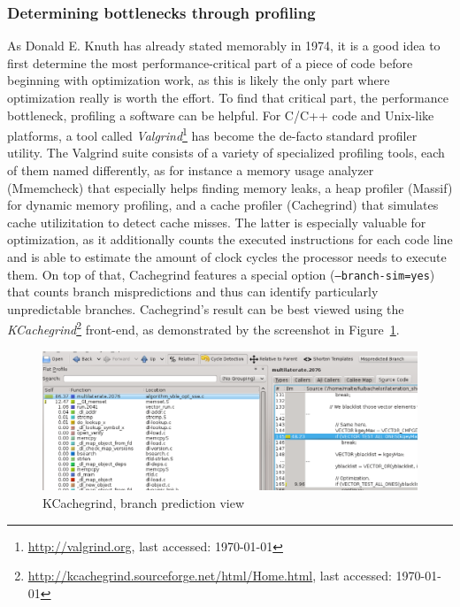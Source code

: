 \subsubsection{Determining bottlenecks through profiling}
As Donald E. Knuth has already stated memorably in 1974, it is a good idea to first determine the most performance-critical part of a piece of code before beginning with optimization work, as this is likely the only part where optimization really is worth the effort. To find that critical part, the performance bottleneck, profiling a software can be helpful. For C/C++ code and Unix-like platforms, a tool called \emph{Valgrind}\footnote{\url{http://valgrind.org}, last accessed: \today{}} has become the de-facto standard profiler utility. The Valgrind suite consists of a variety of specialized profiling tools, each of them named differently, as for instance a memory usage analyzer (Mmemcheck) that especially helps finding memory leaks, a heap profiler (Massif) for dynamic memory profiling, and a cache profiler (Cachegrind) that simulates cache utilizitation to detect cache misses. The latter is especially valuable for optimization, as it additionally counts the executed instructions for each code line and is able to estimate the amount of clock cycles the processor needs to execute them. On top of that, Cachegrind features a special option (\texttt{--branch-sim=yes}) that counts branch mispredictions and thus can identify particularly unpredictable branches. Cachegrind's result can be best viewed using the \emph{KCachegrind}\footnote{\url{http://kcachegrind.sourceforge.net/html/Home.html}, last accessed: \today{}} front-end, as demonstrated by the screenshot in Figure~\ref{fig:kcachegrind}.
\begin{figure}[h]
\begin{center}
\includegraphics[width=14cm]{img/kcachegrind}
\end{center}
\caption{KCachegrind, branch prediction view}
\label{fig:kcachegrind}
\end{figure}

